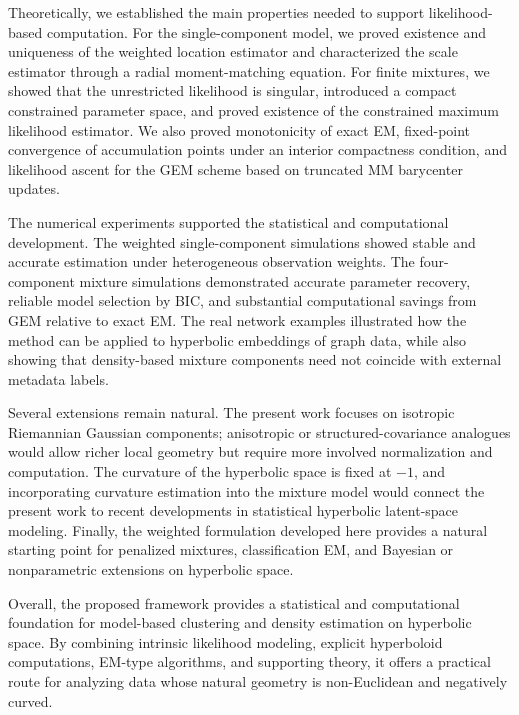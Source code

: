 \documentclass[11pt]{article}
\begin{document}
Theoretically, we established the main properties needed to support likelihood-based computation. For the single-component model, we proved existence and uniqueness of the weighted location estimator and characterized the scale estimator through a radial moment-matching equation. For finite mixtures, we showed that the unrestricted likelihood is singular, introduced a compact constrained parameter space, and proved existence of the constrained maximum likelihood estimator. We also proved monotonicity of exact EM, fixed-point convergence of accumulation points under an interior compactness condition, and likelihood ascent for the GEM scheme based on truncated MM barycenter updates.

The numerical experiments supported the statistical and computational development. The weighted single-component simulations showed stable and accurate estimation under heterogeneous observation weights. The four-component mixture simulations demonstrated accurate parameter recovery, reliable model selection by BIC, and substantial computational savings from GEM relative to exact EM. The real network examples illustrated how the method can be applied to hyperbolic embeddings of graph data, while also showing that density-based mixture components need not coincide with external metadata labels.

Several extensions remain natural. The present work focuses on isotropic Riemannian Gaussian components; anisotropic or structured-covariance analogues would allow richer local geometry but require more involved normalization and computation. The curvature of the hyperbolic space is fixed at \(-1\), and incorporating curvature estimation into the mixture model would connect the present work to recent developments in statistical hyperbolic latent-space modeling. Finally, the weighted formulation developed here provides a natural starting point for penalized mixtures, classification EM, and Bayesian or nonparametric extensions on hyperbolic space.

Overall, the proposed framework provides a statistical and computational foundation for model-based clustering and density estimation on hyperbolic space. By combining intrinsic likelihood modeling, explicit hyperboloid computations, EM-type algorithms, and supporting theory, it offers a practical route for analyzing data whose natural geometry is non-Euclidean and negatively curved.




\end{document}
